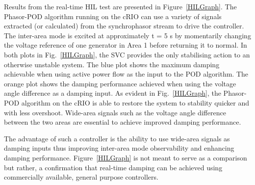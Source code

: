 \documentclass[conference]{IEEEtran}
\begin{document}
Results from the real-time HIL test are presented in Figure~\ref{HILGraph}. The Phasor-POD algorithm running on the cRIO can use a variety of signals extracted (or calculated) from the synchrophasor stream to drive the controller. The inter-area mode is excited at approximately t = 5 s by momentarily changing the voltage reference of one generator in Area 1 before returning it to normal. In both plots in Fig.~\ref{HILGraph}, the SVC provides the only stabilising action to an otherwise unstable \cite{KundurTwoArea} system. The blue plot shows the maximum damping achievable when using active power flow as the input to the POD algorithm. The orange plot shows the damping performance achieved when using the voltage angle difference as a damping input. As evident in Fig.~\ref{HILGraph}, the Phasor-POD algorithm on the cRIO is able to restore the system to stability quicker and with less overshoot. Wide-area signals such as the voltage angle difference between the two areas are essential to achieve improved damping performance.


The advantage of such a controller is the ability to use wide-area signals as damping inputs thus improving inter-area mode observability and enhancing damping performance. Figure~\ref{HILGraph} is not meant to serve as a comparison but rather, a confirmation that real-time damping can be achieved using commercially available, general purpose controllers.\\
\end{document}
